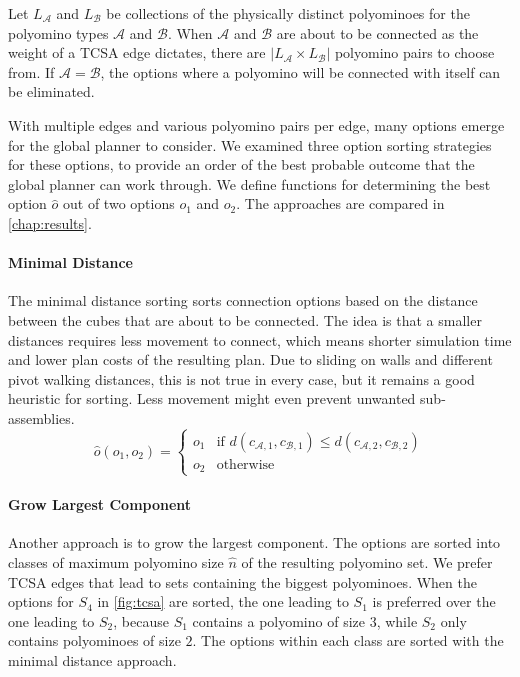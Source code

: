 Let $L_\mathcal{A}$ and $L_\mathcal{B}$ be collections of the physically distinct polyominoes for the polyomino types $\mathcal{A}$ and $\mathcal{B}$.
When $\mathcal{A}$ and $\mathcal{B}$ are about to be connected as the weight of a TCSA edge dictates, there are $\left| L_\mathcal{A} \times L_\mathcal{B} \right|$ polyomino pairs to choose from.
If $\mathcal{A} = \mathcal{B}$, the options where a polyomino will be connected with itself can be eliminated.

With multiple edges and various polyomino pairs per edge, many options emerge for the global planner to consider.
We examined three option sorting strategies for these options, to provide an order of the best probable outcome that the global planner can work through. 
We define functions for determining the best option $\hat{o}$ out of two options $o_1$ and $o_2$.
The approaches are compared in \autoref{chap:results}.

\paragraph{Minimal Distance}

The minimal distance sorting sorts connection options based on the distance between the cubes that are about to be connected.
The idea is that a smaller distances requires less movement to connect, which means shorter simulation time and lower plan costs of the resulting plan.
Due to sliding on walls and different pivot walking distances, this is not true in every case, but it remains a good heuristic for sorting.
Less movement might even prevent unwanted sub-assemblies.
\begin{equation}
\hat{o}(o_1, o_2) =
\begin{cases}
o_1 & \text{if } d(c_{\mathcal{A},1}, c_{\mathcal{B},1}) \leq d(c_{\mathcal{A},2}, c_{\mathcal{B},2}) \\
o_2 & \text{otherwise}
\end{cases}
\end{equation}

\paragraph{Grow Largest Component}

Another approach is to grow the largest component.
The options are sorted into classes of maximum polyomino size $\hat{n}$ of the resulting polyomino set.
We prefer TCSA edges that lead to sets containing the biggest polyominoes.
When the options for $S_4$ in \autoref{fig:tcsa} are sorted, the one leading to $S_1$ is preferred over the one leading to $S_2$, because $S_1$ contains a polyomino of size $3$, while $S_2$ only contains polyominoes of size $2$. 
The options within each class are sorted with the minimal distance approach.

